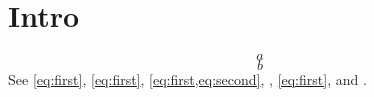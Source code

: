 \documentclass[twocolumn,unicode]{wrapper}
\begin{document}
\wrapperclass\articleclass\layoutmode\hypermode
\section{Intro}
\begin{equation}\label{eq:first}a\end{equation}
\begin{equation}\label{eq:second}b\end{equation}
See \eqref{eq:first}, \autoref{eq:first}, \cref{eq:first,eq:second}, , \vref{eq:first}, and .
\end{document}
